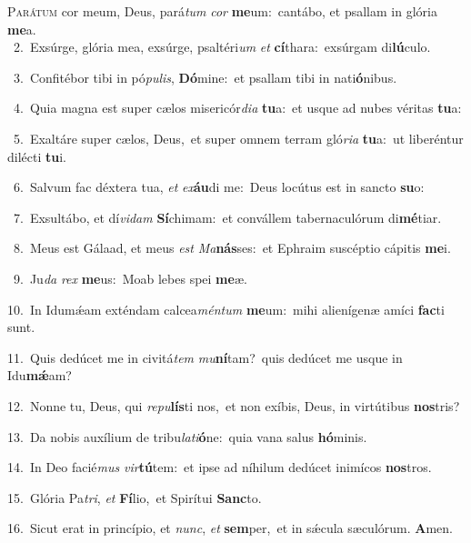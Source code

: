 \lettrine{\initial\textcolor{\initialcolor}{P}}{arátum} cor meum, Deus, pará\textit{tum} \textit{cor} \textbf{me}\-um:~\star cantábo, et psallam in glória \textbf{me}\-a.\\
{\numbfont\textcolor{\numbcolor}{~2.}}~Exsúrge, glória mea, exsúrge, psaltéri\textit{um} \textit{et} \textbf{cí}\-thara:~\star exsúrgam di\-\textbf{lú}\-culo.\par
{\numbfont\textcolor{\numbcolor}{~3.}}~Confitébor tibi in pó\-\textit{pu}\-\textit{lis}, \textbf{Dó}\-mine:~\star et psallam tibi in nati\-\textbf{ó}\-nibus.\par
{\numbfont\textcolor{\numbcolor}{~4.}}~Quia magna est super cælos misericór\-\textit{di}\-\textit{a} \textbf{tu}\-a:~\star et usque ad nubes véritas \textbf{tu}\-a:\par
{\numbfont\textcolor{\numbcolor}{~5.}}~Exaltáre super cælos, Deus,~\dagger et super omnem terram gló\-\textit{ri}\-\textit{a} \textbf{tu}\-a:~\star ut liberéntur dilécti \textbf{tu}\-i.\par
{\numbfont\textcolor{\numbcolor}{~6.}}~Salvum fac déxtera tua, \textit{et} \textit{ex}\-\textbf{áu}di me:~\star Deus locútus est in sancto \textbf{su}\-o:\par
{\numbfont\textcolor{\numbcolor}{~7.}}~Exsultábo, et dí\-\textit{vi}\-\textit{dam} \textbf{Sí}\-chimam:~\star et convállem tabernaculórum di\-\textbf{mé}\-tiar.\par
{\numbfont\textcolor{\numbcolor}{~8.}}~Meus est Gálaad, et meus \textit{est} \textit{Ma}\-\textbf{nás}ses:~\star et Ephraim suscéptio cápitis \textbf{me}\-i.\par
{\numbfont\textcolor{\numbcolor}{~9.}}~Ju\textit{da} \textit{rex} \textbf{me}\-us:~\star Moab lebes spei \textbf{me}\-æ.\par
{\numbfont\textcolor{\numbcolor}{10.}}~In Idumǽam exténdam calcea\-\textit{mén}\-\textit{tum} \textbf{me}\-um:~\star mihi alienígenæ amíci \textbf{fac}\-ti sunt.\par
{\numbfont\textcolor{\numbcolor}{11.}}~Quis dedúcet me in civitá\textit{tem} \textit{mu}\-\textbf{ní}tam?~\star quis dedúcet me usque in Idu\-\textbf{mǽ}\-am?\par
{\numbfont\textcolor{\numbcolor}{12.}}~Nonne tu, Deus, qui \textit{re}\-\textit{pu}\textbf{lís}ti nos,~\star et non exíbis, Deus, in virtútibus \textbf{nos}\-tris?\par
{\numbfont\textcolor{\numbcolor}{13.}}~Da nobis auxílium de tribu\-\textit{la}\-\textit{ti}\textbf{ó}ne:~\star quia vana salus \textbf{hó}\-minis.\par
{\numbfont\textcolor{\numbcolor}{14.}}~In Deo facié\textit{mus} \textit{vir}\-\textbf{tú}tem:~\star et ipse ad níhilum dedúcet inimícos \textbf{nos}\-tros.\par
{\numbfont\textcolor{\numbcolor}{15.}}~Glória Pa\-\textit{tri}\-, \textit{et} \textbf{Fí}\-lio,~\star et Spirítui \textbf{Sanc}\-to.\par
{\numbfont\textcolor{\numbcolor}{16.}}~Sicut erat in princípio, et \textit{nunc}\-, \textit{et} \textbf{sem}\-per,~\star et in sǽcula sæculórum. \textbf{A}\-men.\par
